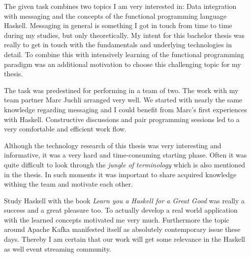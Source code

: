 The given task combines two topics I am very interested in: Data integration
with messaging and the concepts of the functional programming language Haskell.
Messaging in general is something I got in touch from time to time during my
studies, but only theoretically. My intent for this bachelor thesis was really to
get in touch with the fundamentals and underlying technologies in detail. To
combine this with intensively learning of the functional programming paradigm was an
additional motivation to choose this challenging topic for my thesis.

The task was predestined for performing in a team of two. The work with my team
partner Marc Juchli arranged very well. We started with nearly the same
knowledge regarding messaging and I could benefit from Marc's first experiences
with Haskell. Constructive discussions and pair programming sessions led to a
very comfortable and efficient work flow.

Although the technology research of this thesis was very interesting and
informative, it was a very hard and time-consuming starting phase. Often it was
quite difficult to look through the \textit{jungle of terminology} which is also
mentioned in the thesis. In such moments it was important to share acquired
knowledge withing the team and motivate each other.

Study Haskell with the book \textit{Learn you a Haskell for a Great Good} was
really a success and a great pleasure too. To actually develop a real world
application with the learned concepts motivated me very much. Furthermore
the topic around Apache Kafka manifested itself as absolutely contemporary issue
these days. Thereby I am certain that our work will get some relevance in
the Haskell as well event streaming community.



